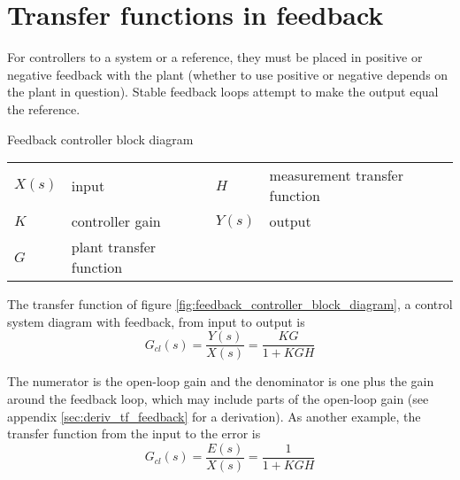\section{Transfer functions in feedback}

For \glspl{controller} to  a \gls{system} or
 a reference, they must be placed in positive or
negative feedback with the \gls{plant} (whether to use positive or negative
depends on the \gls{plant} in question). Stable feedback loops attempt to make
the \gls{output} equal the \gls{reference}.
\begin{bookfigure}

  \caption{Feedback controller block diagram}
  \label{fig:feedback_controller_block_diagram}
  \begin{figurekey}
    \begin{tabular}{llll}
      $X(s)$ & input & $H$ & measurement transfer function \\
      $K$ & controller gain & $Y(s)$ & output \\
      $G$ & plant transfer function & & \\
    \end{tabular}
  \end{figurekey}
\end{bookfigure}

The transfer function of figure \ref{fig:feedback_controller_block_diagram}, a
\gls{control system} diagram with feedback, from input to output is
\begin{equation}
  G_{cl}(s) = \frac{Y(s)}{X(s)} = \frac{KG}{1 + KGH}
\end{equation}

The numerator is the \gls{open-loop gain} and the denominator is one plus the
gain around the feedback loop, which may include parts of the
\gls{open-loop gain} (see appendix \ref{sec:deriv_tf_feedback} for a
derivation). As another example, the transfer function from the input to the
\gls{error} is
\begin{equation}
  G_{cl}(s) = \frac{E(s)}{X(s)} = \frac{1}{1 + KGH}
\end{equation}

